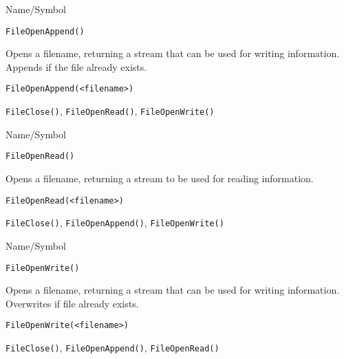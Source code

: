 \begin{desc}{Name/Symbol}
\item[Name/Symbol]	\verb+FileOpenAppend()+

\item[Description] Opens a filename, returning a stream that can be
  used for writing information.  Appends if the file already exists.

\item[Usage]
\begin{verbatim}
FileOpenAppend(<filename>)
\end{verbatim}

\item[Example]	

\item[See Also]	\verb+FileClose()+, \verb+FileOpenRead()+, \verb+FileOpenWrite()+
\end{desc}


\begin{desc}{Name/Symbol}
\item[Name/Symbol]	\verb+FileOpenRead()+

\item[Description]  	Opens a filename, returning  a stream to be used 
		for reading information.

\item[Usage]
\begin{verbatim}
FileOpenRead(<filename>)
\end{verbatim}

\item[Example]	

\item[See Also]	\verb+FileClose()+, \verb+FileOpenAppend()+, \verb+FileOpenWrite()+
\end{desc}

\begin{desc}{Name/Symbol}
\item[Name/Symbol]	\verb+FileOpenWrite()+

\item[Description] Opens a filename, returning a stream that can be
  used for writing information.  Overwrites if file already exists.

\item[Usage]
\begin{verbatim}
FileOpenWrite(<filename>)
\end{verbatim}

\item[Example]	

\item[See Also]	\verb+FileClose()+, \verb+FileOpenAppend()+, \verb+FileOpenRead()+
\end{desc}



